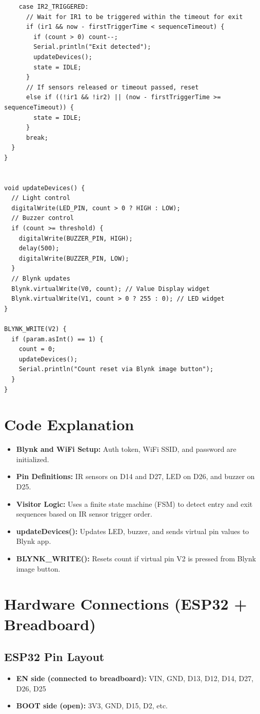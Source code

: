 \documentclass[12pt,a4paper]{article}
\begin{document}
\begin{lstlisting}
    case IR2_TRIGGERED:
      // Wait for IR1 to be triggered within the timeout for exit
      if (ir1 && now - firstTriggerTime < sequenceTimeout) {
        if (count > 0) count--;
        Serial.println("Exit detected");
        updateDevices();
        state = IDLE;
      }
      // If sensors released or timeout passed, reset
      else if ((!ir1 && !ir2) || (now - firstTriggerTime >= sequenceTimeout)) {
        state = IDLE;
      }
      break;
  }
}


void updateDevices() {
  // Light control
  digitalWrite(LED_PIN, count > 0 ? HIGH : LOW);
  // Buzzer control
  if (count >= threshold) {
    digitalWrite(BUZZER_PIN, HIGH);
    delay(500);
    digitalWrite(BUZZER_PIN, LOW);
  }
  // Blynk updates
  Blynk.virtualWrite(V0, count); // Value Display widget
  Blynk.virtualWrite(V1, count > 0 ? 255 : 0); // LED widget
}

BLYNK_WRITE(V2) {
  if (param.asInt() == 1) {
    count = 0;
    updateDevices();
    Serial.println("Count reset via Blynk image button");
  }
}
\end{lstlisting}

\section{Code Explanation}

\begin{itemize}[leftmargin=*]
  \item \textbf{Blynk and WiFi Setup:} Auth token, WiFi SSID, and password are initialized.
  \item \textbf{Pin Definitions:} IR sensors on D14 and D27, LED on D26, and buzzer on D25.
  \item \textbf{Visitor Logic:} Uses a finite state machine (FSM) to detect entry and exit sequences based on IR sensor trigger order.
  \item \textbf{updateDevices():} Updates LED, buzzer, and sends virtual pin values to Blynk app.
  \item \textbf{BLYNK\_WRITE():} Resets count if virtual pin V2 is pressed from Blynk image button.
\end{itemize}

\section{Hardware Connections (ESP32 + Breadboard)}

\subsection*{ESP32 Pin Layout}
\begin{itemize}
  \item \textbf{EN side (connected to breadboard):} VIN, GND, D13, D12, D14, D27, D26, D25
  \item \textbf{BOOT side (open):} 3V3, GND, D15, D2, etc.
\end{itemize}
\end{document}
